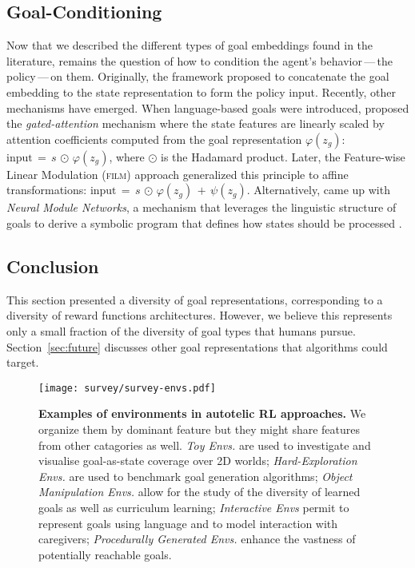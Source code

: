 \subsection{Goal-Conditioning}
Now that we described the different types of goal embeddings found in the literature, remains the question of how to condition the agent's behavior\,---\,\ie the policy\,---\,on them. Originally, the \uvfa framework proposed to concatenate the goal embedding to the state representation to form the policy input. Recently, other mechanisms have emerged. When language-based goals were introduced, \cite{chaplot2017gatedattention} proposed the \textit{gated-attention} mechanism where the state features are linearly scaled by attention coefficients computed from the goal representation $\varphi(z_g)$: $\text{input}\,=\,s\,\odot\,\varphi(z_g)$, where $\odot$ is the Hadamard product. Later, the Feature-wise Linear Modulation (\textsc{film}) approach \cite{perez2018film} generalized this principle to affine transformations: $\text{input}\,=\,s\,\odot\,\varphi(z_g)\, +\,\psi(z_g)$. Alternatively, \cite{Andreas_2016} came up with \textit{Neural Module Networks}, a mechanism that leverages the linguistic structure of goals to derive a symbolic program that defines how states should be processed \cite{bahdanau2018learning}.

\subsection{Conclusion}
This section presented a diversity of goal representations, corresponding to a diversity of reward functions architectures. However, we believe this represents only a small fraction of the diversity of goal types that humans pursue. Section~\ref{sec:future} discusses other goal representations that \rl algorithms could target.

\begin{figure}[h]
    \centering
    \texttt{[image: survey/survey-envs.pdf]}
    \caption{\textbf{Examples of environments in autotelic RL approaches.} We organize them by dominant feature but they might share features from other catagories as well. \textit{Toy Envs.} are used to investigate and visualise goal-as-state coverage over 2D worlds; \textit{Hard-Exploration Envs.} are used to benchmark goal generation algorithms; \textit{Object Manipulation Envs.} allow for the study of the diversity of learned goals as well as curriculum learning; \textit{Interactive Envs} permit to represent goals using language and to model interaction with caregivers; \textit{Procedurally Generated Envs.} enhance the vastness of potentially reachable goals.}
    \label{fig:envs}
\end{figure}


